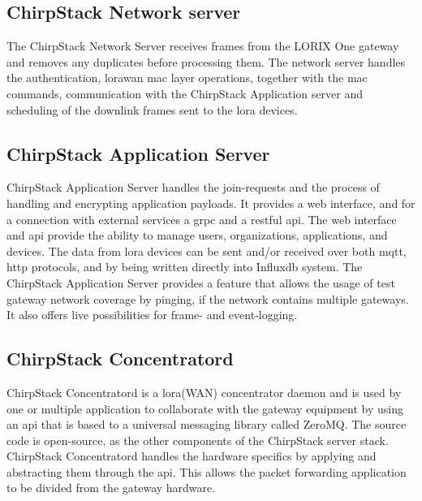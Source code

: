 \subsection{ChirpStack Network server}
The ChirpStack Network Server receives frames from the LORIX One gateway and removes any duplicates before processing them.
The network server handles the authentication, \gls{lorawan} \gls{mac} layer operations, together with the \gls{mac} commands, communication with the ChirpStack Application server and scheduling of the downlink frames sent to the \gls{lora} devices.
\cite{chirpstack:networkServer}

\subsection{ChirpStack Application Server}

ChirpStack Application Server handles the join-requests and the process of handling and encrypting application payloads.
It provides a web interface, and for a connection with external services a \gls{grpc} and a \gls{rest}ful \gls{api}.
The web interface and \gls{api} provide the ability to manage users, organizations, applications, and devices.
The data from \gls{lora} devices can be sent and/or received over both \gls{mqtt}, \gls{http} protocols, and by being  written directly into Influx\gls{db} system.
The ChirpStack Application Server provides a feature that allows the usage of test gateway network coverage by pinging, if the network contains multiple gateways.
It also offers live possibilities for frame- and event-logging.
\cite{chirpstack:applicationServer}

\subsection{ChirpStack Concentratord}
ChirpStack Concentratord is a \gls{lora}(WAN) concentrator daemon and is used by one or multiple application to collaborate with the gateway equipment by using an \gls{api} that is based to a universal messaging library called ZeroMQ.
The source code is open-source, as the other components of the ChirpStack server stack.
ChirpStack Concentratord handles the hardware specifics by applying and abstracting them through the \gls{api}.
This allows the packet forwarding application to be divided from the gateway hardware.
\cite{chirpstack:concentratord}


